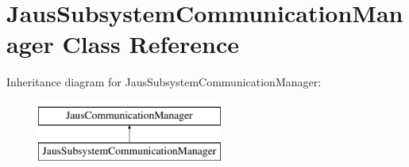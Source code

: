 \hypertarget{class_jaus_subsystem_communication_manager}{\section{\-Jaus\-Subsystem\-Communication\-Manager \-Class \-Reference}
\label{class_jaus_subsystem_communication_manager}
}
\-Inheritance diagram for \-Jaus\-Subsystem\-Communication\-Manager\-:\begin{figure}[H]
\begin{center}
\leavevmode
\includegraphics[height=2.000000cm]{class_jaus_subsystem_communication_manager}
\end{center}
\end{figure}
